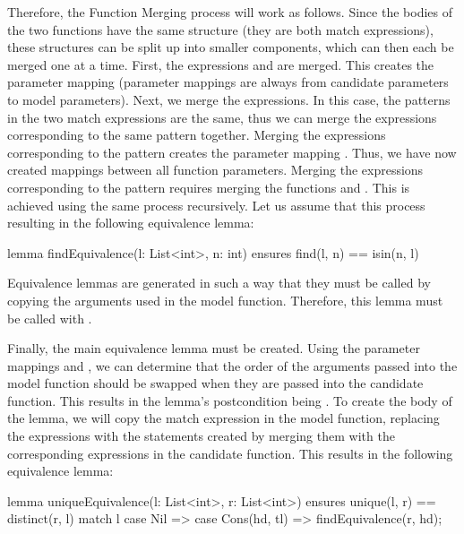 Therefore, the Function Merging process will work as follows. Since the bodies of the two functions have the same structure (they are both match expressions), these structures can be split up into smaller components, which can then each be merged one at a time. First, the expressions  and  are merged. This creates the parameter mapping  (parameter mappings are always from candidate parameters to model parameters). Next, we merge the  expressions. In this case, the patterns in the two match expressions are the same, thus we can merge the  expressions corresponding to the same pattern together. Merging the expressions corresponding to the  pattern creates the parameter mapping . Thus, we have now created mappings between all function parameters. Merging the expressions corresponding to the  pattern requires merging the functions  and . This is achieved using the same process recursively. Let us assume that this process resulting in the following equivalence lemma:

\begin{dafny}
lemma findEquivalence(l: List<int>, n: int)
  ensures find(l, n) == isin(n, l)
{}
\end{dafny}
%
Equivalence lemmas are generated in such a way that they must be called by copying the arguments used in the model function. Therefore, this lemma must be called with .

Finally, the main equivalence lemma must be created. Using the parameter mappings  and , we can determine that the order of the arguments passed into the model function should be swapped when they are passed into the candidate function. This results in the lemma's postcondition being . To create the body of the lemma, we will copy the match expression in the model function, replacing the  expressions with the statements created by merging them with the corresponding expressions in the candidate function. This results in the following equivalence lemma:

\begin{dafny}
lemma uniqueEquivalence(l: List<int>, r: List<int>)
  ensures unique(l, r) == distinct(r, l)
{
  match l
  case Nil => {}
  case Cons(hd, tl) => findEquivalence(r, hd);
}
\end{dafny}

